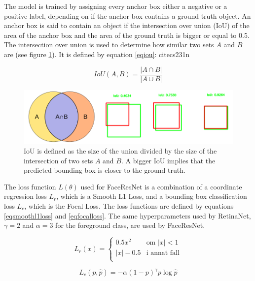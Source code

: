 \documentclass[a4paper, twoside]{article}
\begin{document}
The model is trained by assigning every anchor box either a negative or a positive label, depending on if the anchor box contains a ground truth object. An anchor box is said to contain an object if the intersection over union (IoU) of the area of the anchor box and the area of the ground truth is bigger or equal to 0.5. The intersection over union is used to determine how similar two sets $A$ and $B$ are (see figure \ref{figiou}). It is defined by equation \eqref{eqiou}: cite{cs231n} \cite{iou}

\begin{equation}\label{eqiou}
IoU(A, B)=\frac{|A \cap B|}{|A \cup B|}
\end{equation}

\begin{figure}[h]
	\centering
  		\includegraphics[scale=0.5]{iou.png}
  	\caption{IoU is defined as the size of the union divided by the size of the intersection of two sets $A$ and $B$. A bigger IoU implies that the predicted bounding box is closer to the ground truth. \cite{iou}} \label{figiou}
\end{figure}

The loss function $L(\theta)$ used for FaceResNet is a combination of a coordinate regression loss $L_r$, which is a Smooth L1 Loss, and a bounding box classification loss $L_c$, which is the Focal Loss. The loss functions are defined by equations \eqref{eqsmoothl1loss} and \eqref{eqfocalloss}. The same hyperparameters used by RetinaNet, $\gamma=2$ and $\alpha = 3$ for the foreground class, are used by FaceResNet. \cite{retinanet}

\begin{equation}\label{eqfocalloss}
L_r(x) = \begin{cases}
				0.5x^2 & \mbox{om } |x| < 1\\
				|x| - 0.5 & \mbox{i annat fall}\\
			\end{cases}
\end{equation}

\begin{equation}\label{eqsmoothl1loss}
L_c(p, \hat{p}) = - \alpha (1-p)^{\gamma}p \log{\hat{p}}
\end{equation}
\end{document}
